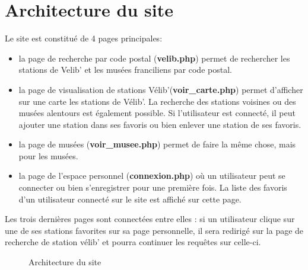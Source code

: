 \documentclass[a4paper]{article}
\begin{document}
\section{Architecture du site}
Le site est constitué de 4 pages principales: 
\begin{itemize}
\item la page de recherche par code postal (\textbf{velib.php}) permet de rechercher les stations de Velib' et les musées franciliens par code postal.
\item la page de visualisation de stations Vélib'(\textbf{voir\_carte.php}) permet d'afficher sur une carte les stations de Vélib'. La recherche des stations voisines ou des musées alentours est également possible.  Si l'utilisateur est connecté, il peut ajouter une station dans ses favoris ou bien enlever une station de ses favoris. 
\item la page de musées (\textbf{voir\_musee.php})  permet de faire la même chose, mais pour les musées.  
\item la page de l'espace personnel (\textbf{connexion.php}) où un utilisateur peut se connecter ou bien s'enregistrer pour une première fois. La liste des favoris d'un utilisateur connecté sur le site est affiché sur cette page. 
\end{itemize}

Les trois dernières pages sont connectées entre elles : si un utilisateur clique sur une de ses stations favorites sur sa page personnelle, il sera redirigé sur la page de recherche de station vélib' et pourra continuer les requêtes sur celle-ci.\\

\begin{figure}[!h]\centering
{}
\label{Archi}
\caption{Architecture du site}
\end{figure}
\end{document}
